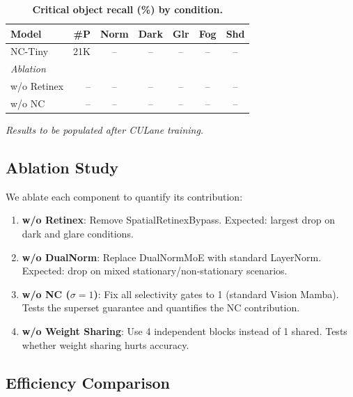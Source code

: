 \documentclass[10pt,twocolumn,letterpaper]{article}
\begin{document}
\begin{table}[t]
\centering
\caption{\textbf{Critical object recall (\%) by condition.}}
\label{tab:det_results}
\setlength{\tabcolsep}{3pt}
\footnotesize
\begin{tabular}{@{}lr ccccc@{}}
\toprule
\textbf{Model} & \textbf{\#P} & \textbf{Norm} & \textbf{Dark} & \textbf{Glr} & \textbf{Fog} & \textbf{Shd} \\
\midrule
NC-Tiny  & 21K & -- & -- & -- & -- & -- \\
\midrule
\multicolumn{7}{l}{\textit{Ablation}} \\
\;w/o Retinex & -- & -- & -- & -- & -- & -- \\
\;w/o NC & -- & -- & -- & -- & -- & -- \\
\bottomrule
\end{tabular}
\end{table}

\textit{Results to be populated after CULane training.}


\subsection{Ablation Study}

We ablate each component to quantify its contribution:
\begin{enumerate}
\setlength\itemsep{0pt}
\item \textbf{w/o Retinex}: Remove SpatialRetinexBypass. Expected: largest drop on dark and glare conditions.
\item \textbf{w/o DualNorm}: Replace DualNormMoE with standard LayerNorm. Expected: drop on mixed stationary/non-stationary scenarios.
\item \textbf{w/o NC ($\sigma = 1$)}: Fix all selectivity gates to 1 (standard Vision Mamba). Tests the superset guarantee and quantifies the NC contribution.
\item \textbf{w/o Weight Sharing}: Use 4 independent blocks instead of 1 shared. Tests whether weight sharing hurts accuracy.
\end{enumerate}


\subsection{Efficiency Comparison}
\end{document}
